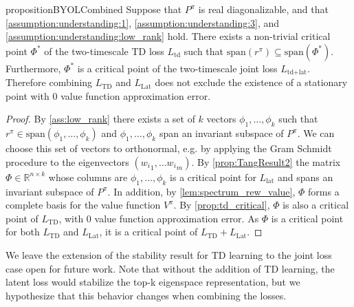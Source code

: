 \begin{restatable}{proposition}{BYOLCombined}\label{prop:understanding:BYOLCombined}
    Suppose that $P^\pi$ is real diagonalizable, and that \autoref{assumption:understanding:1}, \autoref{assumption:understanding:3}, and \autoref{assumption:understanding:low_rank} hold. 
    There exists a non-trivial critical point $\Phi^*$ of the two-timescale TD loss $L_\text{td}$ such that $\mathrm{span}(r^\pi)\subseteq \mathrm{span}(\Phi^*)$. 
    Furthermore, $\Phi^*$ is a critical point of the two-timescale joint loss $L_{\text{td}+\text{lat}}$. Therefore combining $L_\text{TD}$ and $L_\text{Lat}$ does not exclude the existence of a stationary point with $0$ value function approximation error.
\end{restatable}
\begin{proof}
        By \autoref{ass:low_rank} there exists a set of $k$ vectors $\phi_1,\dots,\phi_k$ such that $r^\pi \in \text{span}(\phi_1,\dots,\phi_k)$ and $\phi_1,\dots,\phi_k$ span an invariant subspace of $P^\pi$.
        We can choose this set of vectors to orthonormal, e.g. by applying the Gram Schmidt procedure to the eigenvectors $({w_i}_1,\dots{w_i}_m)$. 
        By \autoref{prop:TangResult2} the matrix $\Phi\in \mathbb{R}^{n\times k}$ whose columns are $\phi_1,\dots,\phi_k$ is a critical point for $L_\text{lat}$ and spans an invariant subspace of $P^\pi$.
        In addition, by \autoref{lem:spectrum_rew_value}, $\Phi$ forms a complete basis for the value function $V^\pi$.
        By \autoref{prop:td_critical}, $\Phi$ is also a critical point of $L_\text{TD}$, with $0$ value function approximation error. 
        As $\Phi$ is a critical point for both $L_\text{TD}$ and $L_\text{Lat}$, it is a critical point of $L_\text{TD} + L_\text{Lat}$.
\end{proof}


We leave the extension of the stability result for TD learning to the joint loss case open for future work.
Note that without the addition of TD learning, the latent loss would stabilize the top-k eigenspace representation, but we hypothesize that this behavior changes when combining the losses.

